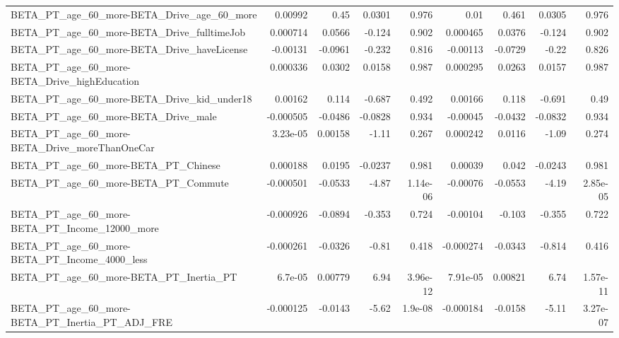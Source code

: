 \begin{tabular}{lrrrrrrrr}
BETA\_PT\_age\_60\_more-BETA\_Drive\_age\_60\_more         &     0.00992 &         0.45 &   0.0301 &    0.976 &       0.01 &       0.461 &       0.0305 &         0.976 \\
BETA\_PT\_age\_60\_more-BETA\_Drive\_fulltimeJob         &    0.000714 &       0.0566 &   -0.124 &    0.902 &   0.000465 &      0.0376 &       -0.124 &         0.902 \\
BETA\_PT\_age\_60\_more-BETA\_Drive\_haveLicense         &    -0.00131 &      -0.0961 &   -0.232 &    0.816 &   -0.00113 &     -0.0729 &        -0.22 &         0.826 \\
BETA\_PT\_age\_60\_more-BETA\_Drive\_highEducation       &    0.000336 &       0.0302 &   0.0158 &    0.987 &   0.000295 &      0.0263 &       0.0157 &         0.987 \\
BETA\_PT\_age\_60\_more-BETA\_Drive\_kid\_under18         &     0.00162 &        0.114 &   -0.687 &    0.492 &    0.00166 &       0.118 &       -0.691 &          0.49 \\
BETA\_PT\_age\_60\_more-BETA\_Drive\_male                &   -0.000505 &      -0.0486 &  -0.0828 &    0.934 &   -0.00045 &     -0.0432 &      -0.0832 &         0.934 \\
BETA\_PT\_age\_60\_more-BETA\_Drive\_moreThanOneCar      &    3.23e-05 &      0.00158 &    -1.11 &    0.267 &   0.000242 &      0.0116 &        -1.09 &         0.274 \\
BETA\_PT\_age\_60\_more-BETA\_PT\_Chinese                &    0.000188 &       0.0195 &  -0.0237 &    0.981 &    0.00039 &       0.042 &      -0.0243 &         0.981 \\
BETA\_PT\_age\_60\_more-BETA\_PT\_Commute                &   -0.000501 &      -0.0533 &    -4.87 & 1.14e-06 &   -0.00076 &     -0.0553 &        -4.19 &      2.85e-05 \\
BETA\_PT\_age\_60\_more-BETA\_PT\_Income\_12000\_more      &   -0.000926 &      -0.0894 &   -0.353 &    0.724 &   -0.00104 &      -0.103 &       -0.355 &         0.722 \\
BETA\_PT\_age\_60\_more-BETA\_PT\_Income\_4000\_less       &   -0.000261 &      -0.0326 &    -0.81 &    0.418 &  -0.000274 &     -0.0343 &       -0.814 &         0.416 \\
BETA\_PT\_age\_60\_more-BETA\_PT\_Inertia\_PT             &     6.7e-05 &      0.00779 &     6.94 & 3.96e-12 &   7.91e-05 &     0.00821 &         6.74 &      1.57e-11 \\
BETA\_PT\_age\_60\_more-BETA\_PT\_Inertia\_PT\_ADJ\_FRE     &   -0.000125 &      -0.0143 &    -5.62 &  1.9e-08 &  -0.000184 &     -0.0158 &        -5.11 &      3.27e-07 \\

\end{tabular}
